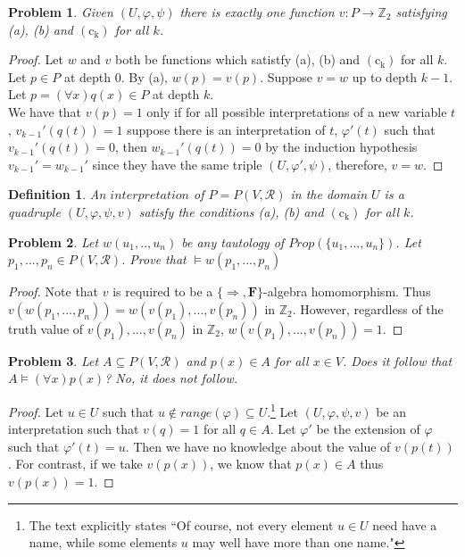 \documentclass{article}
\theoremstyle{problemstyle}
\newtheorem{problem}{Problem}
\theoremstyle{lemmastyle}
\theoremstyle{theoremstyle}
\theoremstyle{problemstyle}
\newtheorem{definition}{Definition}
\begin{document}
\begin{problem}
Given $(U, \varphi, \psi)$ there is exactly one function $v:P \rightarrow \mathbb{Z}_2$ satisfying (a), (b) and $(\text{c}_\text{k})$ for all $k$. 
\end{problem}

\begin{proof}
Let $w$ and $v$ both be functions which satistfy (a), (b) and $(\text{c}_\text{k})$ for all $k$. Let $p \in P$ at depth $0$. By (a), $w(p) = v(p)$. Suppose $v = w$ up to depth $k-1$. Let $p = (\forall x) q(x) \in P$ at depth $k$.\\ 

We have that $v(p) = 1$ only if for all possible interpretations of a new variable $t$, $v_{k-1}'(q(t))=1$ suppose there is an interpretation of $t$, $\varphi'(t)$ such that $v_{k-1}'(q(t))=0$, then $w_{k-1}'(q(t))=0$ by the induction hypothesis $v_{k-1}' = w_{k-1}'$ since they have the same triple $(U, \varphi', \psi)$, therefore, $v = w$. 
\end{proof}

\begin{definition}
An $interpretation$ of $P = P(V,\mathscr{R})$ in the domain $U$ is a quadruple $(U,\varphi,\psi,v)$ satisfy the conditions (a), (b) and $(\text{c}_\text{k})$ for all $k$.
\end{definition}

\begin{problem}
Let $w(u_1,..,u_n)$ be any tautology of $Prop(\{u_1,...,u_n\})$. Let $p_1,...,p_n \in P(V,\mathscr{R})$. Prove that $\vDash w(p_1,...,p_n)$
\end{problem}

\begin{proof}
Note that $v$ is required to be a $\{\Rightarrow, \textbf{F}\}$-algebra homomorphism. Thus $v(w(p_1,...,p_n)) = w(v(p_1),...,v(p_n))$ in $\mathbb{Z}_2$. However, regardless of the truth value of $v(p_1),...,v(p_n)$ in $\mathbb{Z}_2$, $w(v(p_1),...,v(p_n)) = 1$. 
\end{proof}

\begin{problem}
Let $A \subseteq P(V,\mathscr{R})$ and $p(x) \in A$ for all $x \in V$. Does it follow that $A \vDash (\forall x)p(x)$? No, it does not follow.
\end{problem}

\begin{proof}
Let $u \in U$ such that $u \notin range(\varphi) \subseteq U$.\footnote{The text explicitly states ``Of course, not every element $u \in U$ need have a name, while some elements $u$ may well have more than one name."} Let $(U,\varphi,\psi,v)$ be an interpretation such that $v(q) = 1$ for all $q \in A$. Let $\varphi'$ be the extension of $\varphi$ such that $\varphi'(t) = u$. Then we have no knowledge about the value of $v(p(t))$. For contrast, if we take $v(p(x))$, we know that $p(x) \in A$ thus $v(p(x)) = 1$.  
\end{proof}
\end{document}
